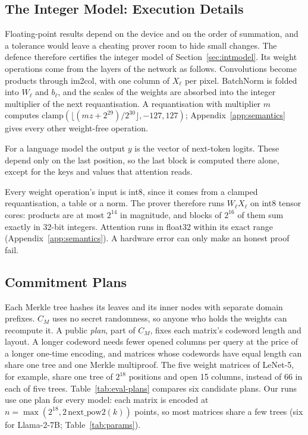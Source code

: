 \providecommand{\F}{\mathbb{F}_p}
\providecommand{\sC}{\mathsf{C}}
\providecommand{\para}[1]{\par\noindent\textbf{#1}\quad}
\providecommand{\todo}[1]{\textbf{[TODO: #1]}}
\providecommand{\toprule}{\hline}
\providecommand{\midrule}{\hline}
\providecommand{\bottomrule}{\hline}

\subsection{The Integer Model: Execution Details}

Floating-point results depend on the device and on the order of summation, and a tolerance would
leave a cheating prover room to hide small changes. The defence therefore certifies the integer
model of Section~\ref{sec:intmodel}. Its weight operations come from the layers of the network as
follows. Convolutions become products through im2col, with one column of $X_\ell$ per pixel.
BatchNorm is folded into $W_\ell$ and $b_\ell$, and the scales of the weights are absorbed into the
integer multiplier of the next requantisation. A requantisation with multiplier $m$ computes
$\mathrm{clamp}(\lfloor(mz+2^{29})/2^{30}\rfloor,-127,127)$; Appendix~\ref{app:semantics} gives
every other weight-free operation.

For a language model the output $y$ is the vector of next-token logits. These depend only on the
last position, so the last block is computed there alone, except for the keys and values that
attention reads.

Every weight operation's input is int8, since it comes from a clamped requantisation, a table or a
norm. The prover therefore runs $W_\ell X_\ell$ on int8 tensor cores: products are at most
$2^{14}$ in magnitude, and blocks of $2^{16}$ of them sum exactly in 32-bit integers. Attention
runs in float32 within its exact range (Appendix~\ref{app:semantics}). A hardware error can only
make an honest proof fail.

\subsection{Commitment Plans}
\label{app:plans}

Each Merkle tree hashes its leaves and its inner nodes with separate domain prefixes. $C_M$ uses
no secret randomness, so anyone who holds the weights can recompute it. A public \emph{plan}, part
of $C_M$, fixes each matrix's codeword length and layout. A longer codeword needs fewer opened
columns per query at the price of a longer one-time encoding, and matrices whose codewords have
equal length can share one tree and one Merkle multiproof. The five weight matrices of LeNet-5, for
example, share one tree of $2^{18}$ positions and open 15 columns, instead of 66 in each of five
trees. Table~\ref{tab:eval-plans} compares six candidate plans. Our runs use one plan for every
model: each matrix is encoded at $n=\max(2^{18},2\,\mathrm{next\_pow2}(k))$ points, so most
matrices share a few trees (six for Llama-2-7B; Table~\ref{tab:params}).

